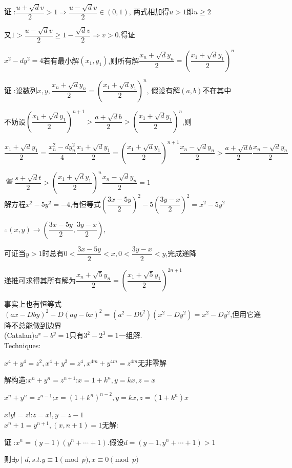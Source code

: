 {\bf 证 }:$ \dfrac{u+\sqrt{d}v}{2}>1\Rightarrow \dfrac{u-\sqrt{d}v}{2}\in(0,1)$,
两式相加得$ u>1$即$ u\ge 2$

又$ 1>\dfrac{u-\sqrt{d}v}{2}\ge 1-\dfrac{\sqrt{d}v}{2}\Rightarrow v>0$.得证

$ x^2-dy^2=4$若有最小解$ (x_1,y_1)$,则所有解$ \dfrac{x_n+\sqrt{d}y_n}{2}=(\dfrac{x_1+\sqrt{d}y_1}{2})^n$

{\bf 证 }:设数列$x,y, \dfrac{x_n+\sqrt{d}y_n}{2}=(\dfrac{x_1+\sqrt{d}y_1}{2})^n$,
假设有解$ (a,b)$不在其中

不妨设$ ( \dfrac{x_1+\sqrt{d}y_1}{2})^{n+1}>\dfrac{a+\sqrt{d}b}{2}>(\dfrac{x_1+\sqrt{d}y_1}{2})^n$,则

$   \dfrac{x_1+\sqrt{d}y_1}{2}=\dfrac{x_n^2-dy_n^2}{4}\dfrac{x_1+\sqrt{d}y_1}{2}=(\dfrac{x_1+\sqrt{d}y_1}{2})^{n+1}\dfrac{x_n-\sqrt{d}y_n}{2}>\dfrac{a+\sqrt{d}b}{2}\dfrac{x_n-\sqrt{d}y_n}{2} $ 

$  \overset{\text{def}}{=} \dfrac{s+\sqrt{d}t}{2}>(\dfrac{x_1+\sqrt{d}y_1}{2})^n\dfrac{x_n-\sqrt{d}y_n}{2}=1$ 
\\

解方程$ x^2-5y^2=-4$,有恒等式$ (\dfrac{3x-5y}{2})^2-5(\dfrac{3y-x}{2})^2=x^2-5y^2$

$ \therefore (x,y)\rightarrow (\dfrac{3x-5y}{2},\dfrac{3y-x}{2}),$

可证当$ y>1$时总有$ 0<\dfrac{3x-5y}{2}<x,0<\dfrac{3y-x}{2}<y$,完成递降

递推可求得其所有解为$ \dfrac{x_n+\sqrt{5}y_n}{2}=(\dfrac{x_1+\sqrt{5}y_1}{2})^{2n+1}$

事实上也有恒等式$ (ax-Dby)^2-D(ay-bx)^2=(a^2-Db^2)(x^2-Dy^2)=x^2-Dy^2$,但用它递降不总能做到边界
\\

(Catalan)$ a^x-b^y=1$只有$ 3^2-2^3=1$一组解.
\\

Techniques:

$ x^4+y^4=z^2 ,x^4+y^2=z^4, x^{4m}+y^{4m}=z^{4m} $无非零解

解构造:$ x^n+y^n=z^{n+1}$:$ x=1+k^n,y=kx,z=x$

$ x^n+y^n=z^{n-1}$:$ x=(1+k^n)^{n-2},y=kx,z=(1+k^n)x$ 

$ x!y!=z!$:$ z=x!,y=z-1$
\\

$ x^n+1=y^{n+1},(x,n+1)=1$无解:

{\bf 证 }:$ x^n=(y-1)(y^n+\cdots +1)$.假设$ d=(y-1,y^n+\cdots +1)>1$

则$ \exists p \mid d ,s.t.y \equiv 1 \pmod p ,x\equiv 0 \pmod p$

